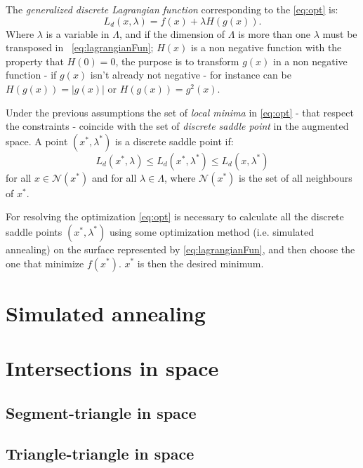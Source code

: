 \documentclass[dissertation.tex]{subfiles}
\begin{document}
The \emph{generalized discrete Lagrangian
  function} corresponding to the \cref{eq:opt} is:
\begin{equation}\label{eq:lagrangianFun}
  L_d(x,\lambda)=f(x)+\lambda H(g(x)).
\end{equation}
Where $\lambda$ is a variable in $\Lambda$, and if the dimension of
$\Lambda$ is more than one $\lambda$ must be transposed in
~\cref{eq:lagrangianFun}; $H(x)$ is a non negative function
with the property that $H(0)=0$, the purpose is to transform $g(x)$ in
a non negative function - if $g(x)$ isn't already not negative - for
instance can be $H(g(x))=|g(x)|$ or $H(g(x))=g^2(x)$.

Under the previous assumptions the set of \emph{local minima}
in \cref{eq:opt} - that respect the constraints -  coincide
with the set of \emph{discrete saddle point}
in the augmented space. A point $(x^*,\lambda^*)$ is a discrete saddle
point if:
\begin{equation*}
  L_d(x^*,\lambda)\leq L_d(x^*,\lambda^*)\leq L_d(x,\lambda^*)
\end{equation*}
for all $x\in\mathcal{N}(x^*)$ and for all $\lambda\in\Lambda$, where
$\mathcal{N}(x^*)$ is the set of all neighbours of $x^*$.

For resolving the optimization \cref{eq:opt} is necessary to
calculate all the discrete saddle points $(x^*,\lambda^*)$ using some
optimization method (i.e. simulated annealing) on the surface
represented by
\cref{eq:lagrangianFun}, and then choose
the one that minimize $f(x^*)$. $x^*$ is then the desired minimum.

\section{Simulated annealing}

\section{Intersections in space}\label{sec:intersections}
\subsection{Segment-triangle in space}
\subsection{Triangle-triangle in space}\label{sec:intersectionsTriangleTriangle}
\end{document}

